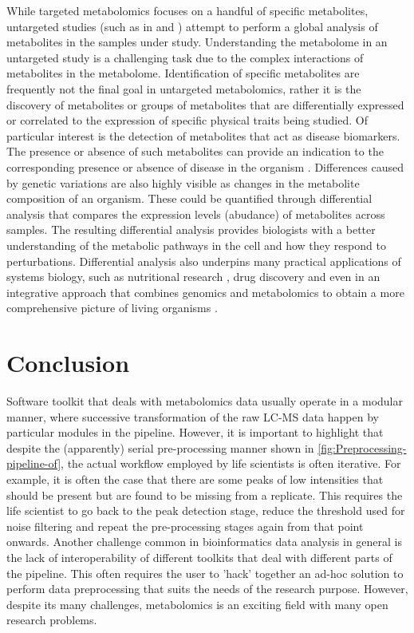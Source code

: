 While targeted metabolomics focuses on a handful of specific metabolites, untargeted studies (such as in \cite{DeVos2007a} and \cite{Creek2011}) attempt to perform a global analysis of metabolites in the samples under study. Understanding the metabolome in an untargeted study is a challenging task due to the complex interactions of metabolites in the metabolome. Identification of specific metabolites are frequently not the final goal in untargeted metabolomics, rather it is the discovery of metabolites or groups of metabolites that are differentially expressed or correlated to the expression of specific physical traits being studied. Of particular interest is the detection of metabolites that act as disease biomarkers. The presence or absence of such metabolites can provide an indication to the corresponding presence or absence of disease in the organism \cite{mamas2011role}. Differences caused by genetic variations are also highly visible as changes in the metabolite composition of an organism. These could be quantified through differential analysis that compares the expression levels (abudance) of metabolites across samples. The resulting differential analysis provides biologists with a better understanding of the metabolic pathways in the cell and how they respond to perturbations. Differential analysis also underpins many practical applications of systems biology, such as nutritional research \cite{Gibney2005}, drug discovery \cite{Kell2006} and even in an integrative approach that combines genomics and metabolomics to obtain a more comprehensive picture of living organisms \cite{Gieger2008}. 

\section{Conclusion}

Software toolkit that deals with metabolomics data usually operate in a modular manner, where successive transformation of the raw LC-MS data happen by particular modules in the pipeline. However, it is important to highlight that despite the (apparently) serial pre-processing manner shown in \ref{fig:Preprocessing-pipeline-of}, the actual workflow employed by life scientists is often iterative. For example, it is often the case that there are some peaks of low intensities that should be present but are found to be missing from a replicate. This requires the life scientist to go back to the peak detection stage, reduce the threshold used for noise filtering and repeat the pre-processing stages again from that point onwards. Another challenge common in bioinformatics data analysis in general is the lack of interoperability of different toolkits that deal with different parts of the pipeline. This often requires the user to 'hack' together an ad-hoc solution to perform data preprocessing that suits the needs of the research purpose. However, despite its many challenges, metabolomics is an exciting field with many open research problems.